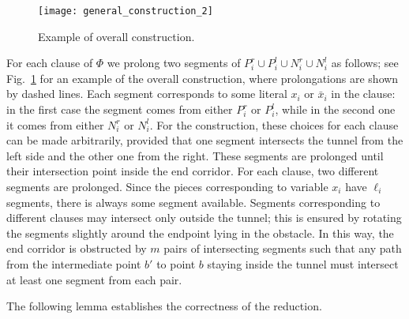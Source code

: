 \documentclass[11pt,a4paper]{article}
\begin{document}
\begin{figure}
\centering
\texttt{[image: general\_construction\_2]}
\caption{Example of overall construction.}
\label{complete}
\end{figure}

For each clause of $\Phi$ we prolong two segments of $P_i^r\cup P_i^l \cup  N_i^r\cup N_i^l$ as follows; see Fig.~\ref{complete} for an example of the overall construction, where prolongations are shown by dashed lines. Each segment corresponds to some literal $x_i$ or $\bar x_i$ in the clause: in the first case the segment comes from either $P_i^r$ or $P_i^l$, while in the second one it comes from either $N_i^r$ or $N_i^l$. For the construction, these choices for each clause can be made arbitrarily, provided that one segment intersects the tunnel from the left side and the other one from the right. These segments are prolonged until their intersection point inside the end corridor. For each clause, two different segments are prolonged. Since the pieces corresponding to variable $x_i$ have $\ell_i$ segments, there is always some segment available. 
Segments corresponding to different clauses may intersect only outside the tunnel; this is ensured by rotating the segments slightly around the endpoint lying in the obstacle. In this way, the end corridor is obstructed by $m$ pairs of intersecting segments such that any path from the intermediate point $b'$ to point $b$ staying inside the tunnel must intersect at least one segment from each pair.  

The following lemma establishes the correctness of the reduction. 
\end{document}
